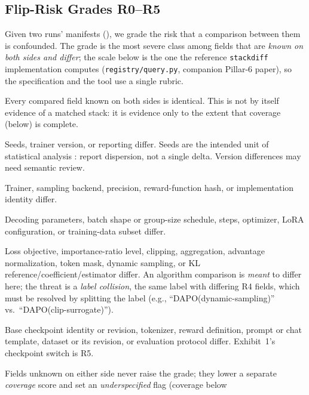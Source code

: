 \subsection{Flip-Risk Grades R0--R5}
\label{sec:p5-grades}
Given two runs' manifests (), we grade the risk that
a comparison between them is confounded. The grade is the most severe class
among fields that are \emph{known on both sides and differ}; the scale below is
the one the reference \texttt{stackdiff} implementation computes
(\texttt{registry/query.py}, companion Pillar-6 paper), so the specification
and the tool use a single rubric.
\begin{description}[leftmargin=1.5em, itemsep=2pt, topsep=2pt]
\item[R0 --- No known difference.] Every compared field known on both sides
is identical. This is not by itself evidence of a matched stack: it is
evidence only to the extent that coverage (below) is complete.
\item[R1 --- Nuisance.] Seeds, trainer version, or reporting differ. Seeds
are the intended unit of statistical analysis \citep{colas2019hitchhiker,
agarwal2021deep}: report dispersion, not a single delta. Version differences
may need semantic review.
\item[R2 --- Runtime (V1).] Trainer, sampling backend, precision,
reward-function hash, or implementation identity differ.
\item[R3 --- Hyperparameter / budget (V3).] Decoding parameters, batch shape
or group-size schedule, steps, optimizer, LoRA configuration, or training-data
subset differ.
\item[R4 --- Algorithm (V2).] Loss objective, importance-ratio level,
clipping, aggregation, advantage normalization, token mask, dynamic sampling,
or KL reference/coefficient/estimator differ. An algorithm comparison is
\emph{meant} to differ here; the threat is a \emph{label collision}, the same
label with differing R4 fields, which must be resolved by splitting the label
(e.g., ``DAPO(dynamic-sampling)'' vs.\ ``DAPO(clip-surrogate)'').
\item[R5 --- Outcome-critical (V4/V5).] Base checkpoint identity or revision,
tokenizer, reward definition, prompt or chat template, dataset or its
revision, or evaluation protocol differ. Exhibit~1's checkpoint switch is R5.
\end{description}
Fields unknown on either side never raise the grade; they lower a separate
\emph{coverage} score and set an \emph{underspecified} flag (coverage below
